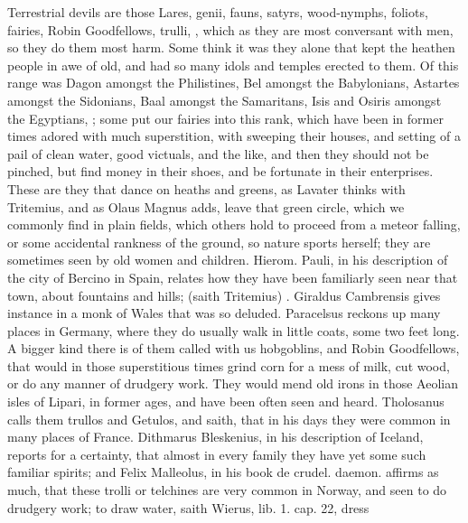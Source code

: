 {{Terrestrial devils are those Lares, genii, fauns, satyrs, 
wood-nymphs, foliots, fairies, Robin Goodfellows, trulli, \etc{}, which as
they are most conversant with men, so they do them most harm. Some
think it was they alone that kept the heathen people in awe of old, and
had so many idols and temples erected to them. Of this range was Dagon
amongst the Philistines, Bel amongst the Babylonians, Astartes amongst
the Sidonians, Baal amongst the Samaritans, Isis and Osiris amongst the
Egyptians, \etc{}; some put our fairies into this rank, which have
been in former times adored with much superstition, with sweeping their
houses, and setting of a pail of clean water, good victuals, and the
like, and then they should not be pinched, but find money in their
shoes, and be fortunate in their enterprises. These are they that dance
on heaths and greens, as Lavater thinks with Tritemius, and as
Olaus Magnus adds, leave that green circle, which we commonly
find in plain fields, which others hold to proceed from a meteor
falling, or some accidental rankness of the ground, so nature sports
herself; they are sometimes seen by old women and children. Hierom.
Pauli, in his description of the city of Bercino in Spain, relates how
they have been familiarly seen near that town, about fountains and
hills;  (saith Tritemius) . Giraldus Cambrensis gives
instance in a monk of Wales that was so deluded. Paracelsus
reckons up many places in Germany, where they do usually walk in little
coats, some two feet long. A bigger kind there is of them called with
us hobgoblins, and Robin Goodfellows, that would in those superstitious
times grind corn for a mess of milk, cut wood, or do any manner of
drudgery work. They would mend old irons in those Aeolian isles of
Lipari, in former ages, and have been often seen and heard.
Tholosanus calls them trullos and Getulos, and saith, that in his
days they were common in many places of France. Dithmarus Bleskenius,
in his description of Iceland, reports for a certainty, that almost in
every family they have yet some such familiar spirits; and Felix
Malleolus, in his book de crudel. daemon. affirms as much, that these
trolli or telchines are very common in Norway, and seen to do
drudgery work; to draw water, saith Wierus, lib. 1. cap. 22, dress
}}
